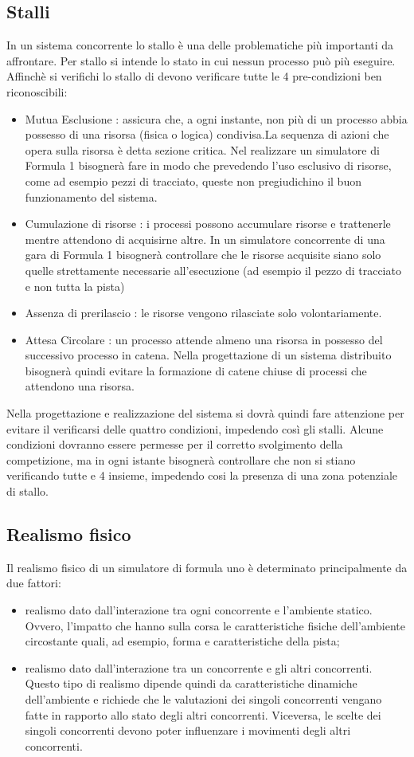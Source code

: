 \subsection{Stalli }
\label{stalli}
In un sistema concorrente lo stallo è una delle problematiche pi\`{u} importanti
da affrontare. Per stallo si intende lo stato in cui nessun processo pu\`{o}
pi\`{u} eseguire. Affinch\`{e} si verifichi lo stallo di devono verificare tutte
le 4 pre-condizioni ben riconoscibili:
\begin{itemize}
\item {Mutua Esclusione :} assicura che, a ogni instante, non pi\`{u} di un
processo abbia possesso di una risorsa (fisica o logica) condivisa.La sequenza
di azioni che opera sulla risorsa \`{e} detta sezione critica. Nel realizzare un
simulatore di Formula 1 bisogner\`{a} fare in modo che prevedendo l'uso
esclusivo di risorse, come ad esempio pezzi di tracciato, queste non
pregiudichino il buon funzionamento del sistema.
\item{Cumulazione di risorse :} i processi possono accumulare
risorse e trattenerle mentre attendono di acquisirne altre. In un simulatore concorrente
di una gara di Formula 1 bisognerà controllare che le risorse acquisite siano solo quelle
strettamente necessarie all'esecuzione (ad esempio il pezzo di tracciato e non tutta la pista)
\item{Assenza di prerilascio :} le risorse vengono rilasciate solo
volontariamente.
\item{Attesa Circolare :} un processo attende almeno una risorsa in possesso del
successivo processo in catena. Nella progettazione di un sistema distribuito
bisogner\`{a} quindi evitare la formazione di catene chiuse di processi che
attendono una risorsa.
\end{itemize}
Nella progettazione e realizzazione del sistema si dovr\`{a} quindi fare
attenzione per evitare il verificarsi delle quattro condizioni, impedendo
cos\`{i} gli stalli. Alcune condizioni dovranno essere permesse per il corretto
svolgimento della competizione, ma in ogni istante bisognerà controllare che non si
stiano verificando tutte e 4 insieme, impedendo cosi la presenza di una zona potenziale
di stallo.
\subsection{Realismo fisico}
Il realismo fisico di un simulatore di formula uno è determinato principalmente
da due fattori:
\begin{itemize}
\item realismo dato dall'interazione tra ogni concorrente e l'ambiente statico.
Ovvero, l'impatto che hanno sulla corsa
le caratteristiche fisiche dell'ambiente circostante quali, ad esempio, forma e
caratteristiche della pista;
\item realismo dato dall'interazione tra un concorrente e gli altri concorrenti.
Questo tipo di realismo 
dipende quindi da caratteristiche dinamiche dell'ambiente e richiede che le
valutazioni dei singoli concorrenti
vengano fatte in rapporto allo stato degli altri concorrenti. Viceversa, le
scelte dei singoli concorrenti
devono poter influenzare i movimenti degli altri concorrenti.
\end{itemize}
